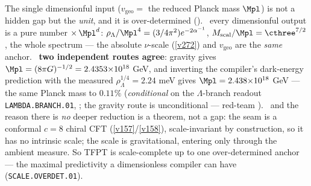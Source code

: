 \begin{keybox}
The single dimensionful input ($v_{\mathrm{geo}}=$ the reduced Planck mass $\Mpl$) is not a hidden gap but the
\emph{unit}, and it is over-determined (). \mE\ every dimensionful output
is a pure number $\times\,\Mpl^d$: $\rho_\Lambda/\Mpl^4=(3/4\pi^2)e^{-2\alpha^{-1}}$, $M_{\mathrm{scal}}/\Mpl
=\cthree^{7/2}$, the whole spectrum --- the absolute $\nu$-scale (\vref{v272}) and $v_{\mathrm{geo}}$ are the
\emph{same} anchor. \mC\ \textbf{two independent routes agree}: gravity gives $\Mpl=(8\pi G)^{-1/2}
=2.4353{\times}10^{18}$ GeV, and inverting the compiler's dark-energy prediction with the measured
$\rho_\Lambda^{1/4}=2.24$ meV gives $\Mpl=2.438{\times}10^{18}$ GeV --- the same Planck mass to $0.11\%$
(\emph{conditional} on the $\Lambda$-branch readout \texttt{LAMBDA.BRANCH.01}, \mC; the gravity route is
unconditional --- red-team ). \mE\ and
the reason there is \emph{no} deeper reduction is a theorem, not a gap: the seam is a conformal $c{=}8$ chiral CFT
(\vref{v157}/\vref{v158}), scale-invariant by construction, so it has no intrinsic scale; the scale is
gravitational, entering only through the ambient measure. So TFPT is scale-complete up to one over-determined
anchor --- the maximal predictivity a dimensionless compiler can have (\texttt{SCALE.OVERDET.01}).
\end{keybox}

